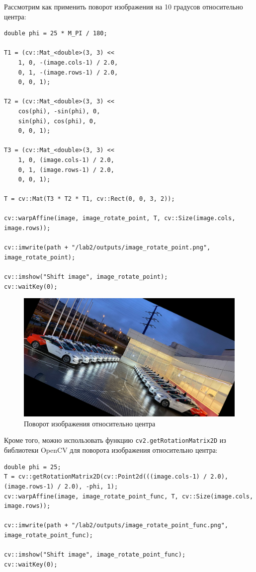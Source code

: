 Рассмотрим как применить поворот изображения на 10 градусов относительно центра:
\begin{lstlisting}[style=cpp_white, caption={Исходный код для поворота изображения с использованием библиотеки OpenCV}]
double phi = 25 * M_PI / 180;

T1 = (cv::Mat_<double>(3, 3) << 
    1, 0, -(image.cols-1) / 2.0, 
    0, 1, -(image.rows-1) / 2.0,
    0, 0, 1); 

T2 = (cv::Mat_<double>(3, 3) << 
    cos(phi), -sin(phi), 0, 
    sin(phi), cos(phi), 0,
    0, 0, 1);  

T3 = (cv::Mat_<double>(3, 3) << 
    1, 0, (image.cols-1) / 2.0, 
    0, 1, (image.rows-1) / 2.0,
    0, 0, 1);   

T = cv::Mat(T3 * T2 * T1, cv::Rect(0, 0, 3, 2));

cv::warpAffine(image, image_rotate_point, T, cv::Size(image.cols, image.rows)); 

cv::imwrite(path + "/lab2/outputs/image_rotate_point.png", image_rotate_point);

cv::imshow("Shift image", image_rotate_point); 
cv::waitKey(0); 
\end{lstlisting}

\begin{figure}[ht]
    \includegraphics[width=\textwidth]{../outputs/image_rotate_point.png}
    \caption{Поворот изображения относительно центра}
    \label{fig:rotate_image_center}
\end{figure}

Кроме того, можно использовать функцию \texttt{cv2.getRotationMatrix2D} из библиотеки OpenCV для поворота изображения относительно центра:
\begin{lstlisting}[style=cpp_white, caption={Исходный код для поворота изображения относительно центра с использованием библиотеки OpenCV}]
double phi = 25;
T = cv::getRotationMatrix2D(cv::Point2d(((image.cols-1) / 2.0), (image.rows-1) / 2.0), -phi, 1);
cv::warpAffine(image, image_rotate_point_func, T, cv::Size(image.cols, image.rows)); 

cv::imwrite(path + "/lab2/outputs/image_rotate_point_func.png", image_rotate_point_func);

cv::imshow("Shift image", image_rotate_point_func); 
cv::waitKey(0); 
\end{lstlisting}

